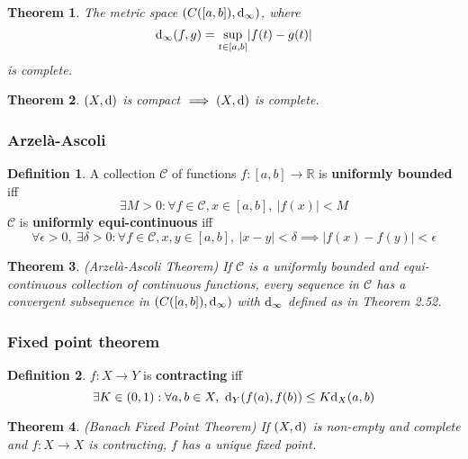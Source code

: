 \documentclass[12pt]{article}
\newtheorem{thm}{Theorem}[section]
\theoremstyle{definition}
\newtheorem{defn}{Definition}[section]
\renewcommand{\d}{{\textnormal{d}}}
\begin{document}
\begin{thm}
	The metric space $(C([a, b]), \d_{\infty})$, where
	$$\d_{\infty}(f, g) = \sup_{t \in [a, b]} \lvert f(t) - g(t) \rvert$$
	is complete.
\end{thm}

\begin{thm}
	$(X, \d)$ is compact $\implies (X, \d)$ is complete.
\end{thm}

\subsubsection{Arzel\`a-Ascoli}

\begin{defn}
	A collection $\mathcal{C}$ of functions $f : [a, b] \to \mathbb{R}$ is \textbf{uniformly bounded} iff
	$$\exists M > 0 : \forall f \in \mathcal{C}, x \in [a, b],\ \lvert f(x)\rvert < M$$
	$\mathcal{C}$ is \textbf{uniformly equi-continuous} iff
	$$\forall \epsilon > 0,\ \exists \delta > 0 : \forall f \in \mathcal{C}, x, y \in [a, b],\ \lvert x - y \rvert < \delta \implies \lvert f(x) - f(y) \rvert < \epsilon$$
\end{defn}

\begin{thm}
	(Arzel\`a-Ascoli Theorem)
	If $\mathcal{C}$ is a uniformly bounded and equi-continuous collection of continuous functions, every sequence in $\mathcal{C}$ has a convergent subsequence in $(C([a, b]), \d_{\infty})$ with $\d_{\infty}$ defined as in Theorem 2.52.
\end{thm}

\subsubsection{Fixed point theorem}

\begin{defn}
	$f : X \to Y$ is \textbf{contracting} iff
	$$\exists K \in (0, 1) : \forall a, b \in X,\ \d_Y(f(a), f(b)) \leq K\d_X(a, b)$$
\end{defn}

\begin{thm}
	(Banach Fixed Point Theorem)
	If $(X, \d)$ is non-empty and complete and $f : X \to X$ is contracting, $f$ has a unique fixed point.
\end{thm}
\end{document}
